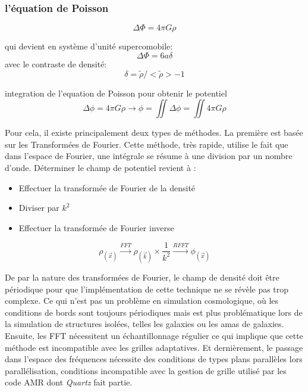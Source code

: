 \subsubsection{l'équation de Poisson}
\begin{equation}
\Delta \Phi = 4 \pi G \rho
\end{equation}

qui devient en système d'unité supercomobile:
\begin{equation}
\Delta \Phi = 6 a \delta
\end{equation}
avec le contraste de densité: 
\begin{equation}
\delta = \tilde{\rho} / < \tilde{\rho} > - 1 
\end{equation}

integration de l'equation de Poisson pour obtenir le potentiel
\begin{equation}
\Delta \phi = 4\pi G \rho \longrightarrow \phi = \iint \Delta \phi = \iint 4\pi G \rho
\end{equation}

Pour cela, il existe principalement deux types de méthodes. La première est basée sur les Transformées de Fourier. Cette méthode, très rapide, utilise le fait que dans l'espace de Fourier, une intégrale se résume à une division par un nombre d'onde. Déterminer le champ de potentiel revient à : 
\begin{itemize}
\item Effectuer la transformée de Fourier de la densité
\item Diviser par $k^2$
\item Effectuer la transformée de Fourier inverse
\end{itemize}

\begin{equation}
\rho_{(\vec{x})} \overset{FFT}{\longrightarrow}  \rho_{(\vec{k})} \times \frac{1}{k^2}  \overset{RFFT}{\longrightarrow}  \phi_{(\vec{x})}
\end{equation}

De par la nature des transformées de Fourier, le champ de densité doit être périodique pour que l'implémentation de cette technique ne se révèle pas trop complexe. Ce qui n'est pas un problème en simulation cosmologique, où les conditions de bords sont toujours périodiques mais est plus problématique lors de la simulation de structures isolées, telles les galaxies ou les amas de galaxies. Ensuite, les FFT nécessitent un échantillonnage régulier ce qui implique que cette méthode est incompatible avec les grilles adaptatives. Et dernièrement, le passage dans l'espace des fréquences nécessite des conditions de types plans parallèles lors parallélisation, conditions incompatible avec la gestion de grille utilisé par les code AMR dont \emph{Quartz} fait partie. \\

